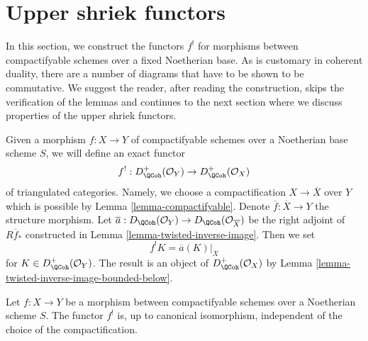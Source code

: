 \section{Upper shriek functors}
\label{section-upper-shriek}

\noindent
In this section, we construct the functors $f^!$ for morphisms
between compactifyable schemes over a fixed Noetherian base.
As is customary in coherent duality, there are a number of diagrams
that have to be shown to be commutative. We suggest the reader,
after reading the construction, skips the verification of the
lemmas and continues to the next section where we discuss
properties of the upper shriek functors.

\medskip\noindent
Given a morphism $f : X \to Y$ of compactifyable schemes over a Noetherian
base scheme $S$, we will define an exact functor
$$
f^! : D_\QCoh^+(\mathcal{O}_Y) \to D_\QCoh^+(\mathcal{O}_X)
$$
of triangulated categories. Namely, we choose a compactification
$X \to \overline{X}$ over $Y$ which is possible by
Lemma \ref{lemma-compactifyable}. Denote $\overline{f} : \overline{X} \to Y$
the structure morphism. Let
$\overline{a} : D_\QCoh(\mathcal{O}_Y) \to D_\QCoh(\mathcal{O}_{\overline{X}})$
be the right adjoint of $R\overline{f}_*$
constructed in Lemma \ref{lemma-twisted-inverse-image}. Then we set
$$
f^!K  = \overline{a}(K)|_X
$$
for $K \in D_\QCoh^+(\mathcal{O}_Y)$. The result is an object of
$D_\QCoh^+(\mathcal{O}_X)$ by
Lemma \ref{lemma-twisted-inverse-image-bounded-below}.

\begin{lemma}
\label{lemma-shriek-well-defined}
Let $f : X \to Y$ be a morphism between compactifyable schemes over a
Noetherian scheme $S$. The functor $f^!$ is, up to canonical isomorphism,
independent of the choice of the compactification.
\end{lemma}

